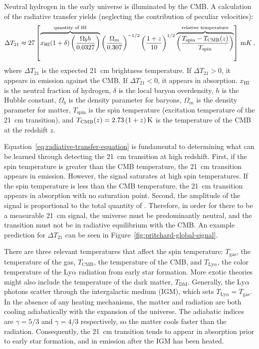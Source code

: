 \begin{bibunit}
Neutral hydrogen in the early universe is illuminated by the CMB. A calculation of the radiative
transfer \citep{2012RPPh...75h6901P} yields (neglecting the contribution of peculiar velocities):
\begin{equation}\label{eq:radiative-transfer-equation}
    \Delta T_{21} \approx 27 \left[
        \overbrace{
            x_\text{HI} (1+\delta)
            \left(\frac{\Omega_b h}{0.0327}\right)
        }^{\text{quantity of HI}}
        \left(\frac{\Omega_m}{0.307}\right)^{-1/2}
        \left(\frac{1+z}{10}\right)^{1/2}
        \overbrace{
            \left(\frac{T_\text{spin} - T_\text{CMB}(z)}{T_\text{spin}}\right)
        }^{\text{relative temperature}}
    \right] \, {\rm mK} \,,
\end{equation}
where $\Delta T_{21}$ is the expected 21~cm brightness temperature. If $\Delta T_{21} > 0$, it
appears in emission against the CMB. If $\Delta T_{21} < 0$, it appears in absorption. $x_\text{HI}$
is the neutral fraction of hydrogen, $\delta$ is the local baryon overdensity, $h$ is the Hubble
constant, $\Omega_b$ is the density parameter for baryons, $\Omega_m$ is the density parameter for
matter, $T_\text{spin}$ is the spin temperature (excitation temperature of the 21~cm transition),
and $T_\text{CMB}(z) = 2.73\,(1+z)\,{\rm K}$ is the temperature of the CMB at the redshift $z$.

Equation~\ref{eq:radiative-transfer-equation} is fundamental to determining what can be learned
through detecting the 21~cm transition at high redshift. First, if the spin temperature is greater
than the CMB temperature, the 21~cm transition appears in emission. However, the signal saturates at
high spin temperatures. If the spin temperature is less than the CMB temperature, the 21~cm
transition appears in absorption with no saturation point. Second, the amplitude of the signal is
proportional to the total quantity of . Therefore, in order for there to be a measurable
21~cm signal, the universe must be predominantly neutral, and the transition must not be in
radiative equilibrium with the CMB. An example prediction for $\Delta T_{21}$ can be seen in
Figure~\ref{fig:pritchard-global-signal}.

There are three relevant temperatures that affect the spin temperature: $T_\text{gas}$, the
temperature of the gas, $T_\text{CMB}$, the temperature of the CMB, and $T_{\text{Ly}\alpha}$, the
color temperature of the Ly$\alpha$ radiation from early star formation. More exotic theories might
also include the temperature of the dark matter, $T_\text{DM}$. Generally,  the Ly$\alpha$ photons
scatter through the intergalactic medium (IGM), which sets $T_{\text{Ly}\alpha} = T_\text{gas}$. In
the absence of any heating mechanisms, the matter and radiation are both cooling adiabatically with
the expansion of the universe.  The adiabatic indices are $\gamma = 5/3$ and $\gamma = 4/3$
respectively, so the matter cools faster than the radiation. Consequently, the 21~cm transition
tends to appear in absorption prior to early star formation, and in emission after the IGM has been
heated.


\end{bibunit}
